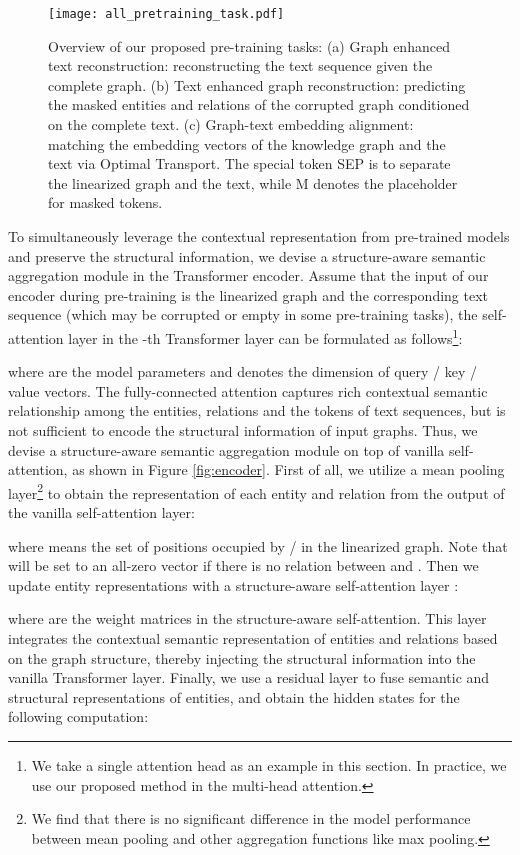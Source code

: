 \documentclass[11pt,a4paper]{article}
\begin{document}
\begin{figure*}[!htp]
  \centering
  \texttt{[image: all\_pretraining\_task.pdf]}\caption{Overview of our proposed pre-training tasks: (a) Graph enhanced text reconstruction: reconstructing the text sequence given the complete graph. (b) Text enhanced graph reconstruction: predicting the masked entities and relations of the corrupted graph conditioned on the complete text. (c) Graph-text embedding alignment: matching the embedding vectors of the knowledge graph and the text via Optimal Transport. The special token SEP is to separate the linearized graph and the text, while M denotes the placeholder for masked tokens.}
  \label{fig:overview}
\end{figure*}

To simultaneously leverage the contextual representation from pre-trained models and preserve the structural information, we devise a structure-aware semantic aggregation module in the Transformer encoder. 
Assume that the input of our encoder during pre-training is the linearized graph  and the corresponding text sequence  (which may be corrupted or empty in some pre-training tasks), the self-attention layer in the -th Transformer layer can be formulated as follows\footnote{We take a single attention head as an example in this section. In practice, we use our proposed method in the multi-head attention.}:

where  are the model parameters
and  denotes the dimension of query / key / value vectors. The fully-connected attention captures rich contextual semantic relationship among the entities, relations and the tokens of text sequences, but is not sufficient to encode the structural information of input graphs. Thus, we devise a structure-aware semantic aggregation module on top of vanilla self-attention, as shown in Figure \ref{fig:encoder}. First of all, we utilize a mean pooling layer\footnote{We find that there is no significant difference in the model performance between mean pooling and other aggregation functions like max pooling.} to obtain the representation of each entity and relation from the output of the vanilla self-attention layer:

where  means the set of positions occupied by  /  in the linearized graph.
Note that  will be set to an all-zero vector if there is no relation between  and . 
Then we update entity representations with a structure-aware self-attention layer \cite{shaw2018relative}:


where  are the weight matrices in the structure-aware self-attention. This layer 
integrates the contextual semantic representation of entities and relations based on the graph structure, thereby injecting the structural information into the vanilla Transformer layer. Finally, we use a residual layer to fuse semantic and structural representations of entities, and obtain the hidden states for the following computation:
\end{document}
